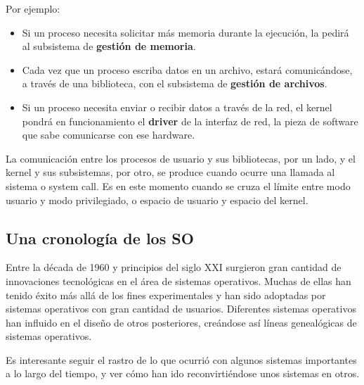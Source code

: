 \documentclass[spanish,A4,]{article}
\begin{document}
Por ejemplo:

\begin{itemize}
\itemsep1pt\parskip0pt
\item
  Si un proceso necesita solicitar más memoria durante la ejecución, la
  pedirá al subsistema de \textbf{gestión de memoria}.
\item
  Cada vez que un proceso escriba datos en un archivo, estará
  comunicándose, a través de una biblioteca, con el subsistema de
  \textbf{gestión de archivos}.
\item
  Si un proceso necesita enviar o recibir datos a través de la red, el
  kernel pondrá en funcionamiento el \textbf{driver} de la interfaz de
  red, la pieza de software que sabe comunicarse con ese hardware.
\end{itemize}

La comunicación entre los procesos de usuario y sus bibliotecas, por un
lado, y el kernel y sus subsistemas, por otro, se produce cuando ocurre
una llamada al sistema o system call. Es en este momento cuando se cruza
el límite entre modo usuario y modo privilegiado, o espacio de usuario y
espacio del kernel.

\subsection{Una cronología de los SO}\label{una-cronologuxeda-de-los-so}

Entre la década de 1960 y principios del siglo XXI surgieron gran
cantidad de innovaciones tecnológicas en el área de sistemas operativos.
Muchas de ellas han tenido éxito más allá de los fines experimentales y
han sido adoptadas por sistemas operativos con gran cantidad de
usuarios. Diferentes sistemas operativos han influido en el diseño de
otros posteriores, creándose así líneas genealógicas de sistemas
operativos.

Es interesante seguir el rastro de lo que ocurrió con algunos sistemas
importantes a lo largo del tiempo, y ver cómo han ido reconvirtiéndose
unos sistemas en otros.
\end{document}
